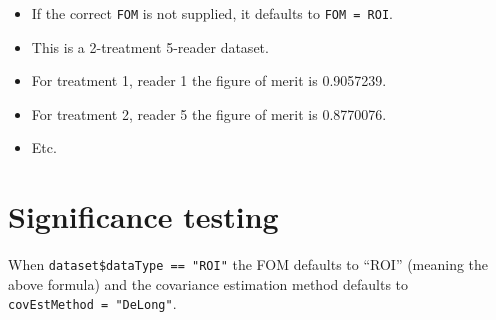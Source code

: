 \documentclass[
]{book}
\providecommand{\tightlist}{%
  \setlength{\itemsep}{0pt}\setlength{\parskip}{0pt}}
\begin{document}
\begin{itemize}
\tightlist
\item
  If the correct \texttt{FOM} is not supplied, it defaults to \texttt{FOM\ =\ ROI}.\\
\item
  This is a 2-treatment 5-reader dataset.\\
\item
  For treatment 1, reader 1 the figure of merit is 0.9057239.\\
\item
  For treatment 2, reader 5 the figure of merit is 0.8770076.\\
\item
  Etc.
\end{itemize}

\hypertarget{significance-testing}{%
\section{Significance testing}\label{significance-testing}}

When \texttt{dataset\$dataType\ ==\ "ROI"} the FOM defaults to ``ROI'' (meaning the above formula) and the covariance estimation method defaults to \texttt{covEstMethod\ =\ "DeLong"}.
\end{document}
